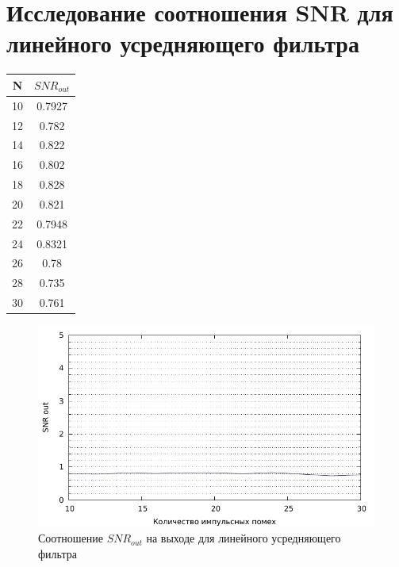 \documentclass[12pt, a4paper] {ncc}
\begin{document}
\section{Исследование соотношения SNR для линейного усредняющего фильтра}
        \begin{table}[H]
            \centering
            \begin{tabular} { |c|c| }
                \hline
					\textbf{N} & \textbf{$SNR_{out}$} \\ \hline
                    10 & 0.7927 \\ \hline
                    12 & 0.782 \\ \hline
                    14 & 0.822 \\ \hline
                    16 & 0.802 \\ \hline
                    18 & 0.828 \\ \hline
                    20 & 0.821 \\ \hline
                    22 & 0.7948 \\ \hline
                    24 & 0.8321 \\ \hline
                    26 & 0.78 \\ \hline
                    28 & 0.735 \\ \hline
                    30 & 0.761 \\ \hline
            \end{tabular}
        \end{table}

        \begin{figure}[H]
            \centering
            \includegraphics[scale=0.9,page=1]{lin.pdf}
			\caption{Соотношение $SNR_{out}$ на выходе для линейного усредняющего фильтра}
        \end{figure}
\end{document}

